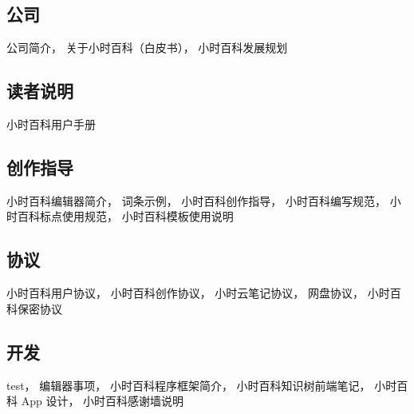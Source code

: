 
\subsection{公司}
公司简介，
关于小时百科（白皮书），
小时百科发展规划

\subsection{读者说明}
小时百科用户手册

\subsection{创作指导}
小时百科编辑器简介，
词条示例，
小时百科创作指导，
小时百科编写规范，
小时百科标点使用规范，
小时百科模板使用说明

\subsection{协议}
小时百科用户协议，
小时百科创作协议，
小时云笔记协议，
网盘协议，
小时百科保密协议

\subsection{开发}
test，
编辑器事项，
小时百科程序框架简介，
小时百科知识树前端笔记，
小时百科 App 设计，
小时百科感谢墙说明
